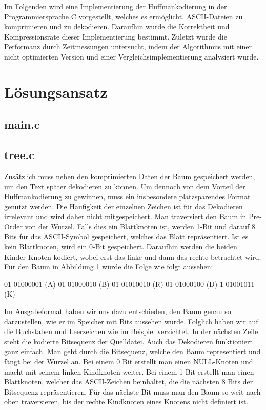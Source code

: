 \documentclass[course=erap]{aspdoc}
\begin{document}
Im Folgenden wird eine Implementierung der Huffmankodierung in der Programmiersprache C vorgestellt, welches es ermöglicht, ASCII-Dateien zu komprimieren und zu dekodieren. Daraufhin wurde die Korrektheit und Kompressionsrate %
dieser Implementierung bestimmt. Zuletzt wurde die Performanz durch Zeitmessungen untersucht, indem der Algorithmus mit einer nicht optimierten Version und einer Vergleichsimplementierung analysiert wurde.

\section{Lösungsansatz}
\subsection{main.c}
\subsection{tree.c}
Zusätzlich muss neben den komprimierten Daten der Baum gespeichert werden, um den Text später dekodieren zu können. Um dennoch von dem Vorteil der Huffmankodierung zu gewinnen, muss ein insbesondere platzsparendes Format genutzt werden. Die Häufigkeit der einzelnen Zeichen ist für das Dekodieren irrelevant und wird daher nicht mitgespeichert.
Man traversiert den Baum in Pre-Order von der Wurzel. Falls dies ein Blattknoten ist, werden 1-Bit und darauf 8 Bits für das ASCII-Symbol gespeichert, welches das Blatt repräsentiert. Ist es kein Blattknoten, wird ein 0-Bit gespeichert. Daraufhin werden die beiden Kinder-Knoten kodiert, wobei erst das linke und dann das rechte betrachtet wird.
Für den Baum in Abbildung 1 würde die Folge wie folgt aussehen:

\begin{center}
    01 01000001 (A) 01 01000010 (B) 01 01010010 (R) 01 01000100 (D) 1 01001011 (K)
\end{center}

Im Ausgabeformat haben wir uns dazu entschieden, den Baum genau so darzustellen, wie er im Speicher mit Bits aussehen wurde. Folglich haben wir auf die Buchstaben und Leerzeichen wie im Beispiel verzichtet. In der nächsten Zeile steht die kodierte Bitsequenz der Quelldatei. %
Auch das Dekodieren funktioniert ganz einfach. Man geht durch die Bitsequenz, welche den Baum representiert und fängt bei der Wurzel an. Bei einem 0 Bit erstellt man einen NULL-Knoten und macht mit seinem linken Kindknoten weiter.
Bei einem 1-Bit erstellt man einen Blattknoten, welcher das ASCII-Zeichen beinhaltet, die die nächsten 8 Bits der Bitsequenz repräsentieren. Für das nächste Bit muss man den Baum so weit nach oben traversieren, bis der rechte Kindknoten eines Knotens nicht definiert ist.
\end{document}
